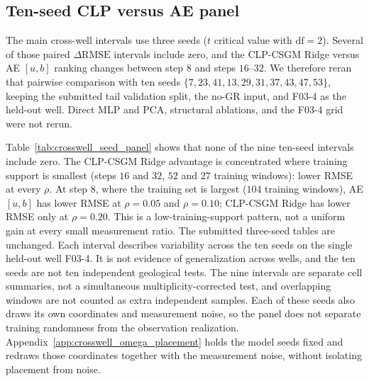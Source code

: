 \subsection{Ten-seed CLP versus AE panel}
\label{app:crosswell_seed_panel}

The main cross-well intervals use three seeds ($t$ critical value with
$\mathrm{df}=2$). Several of those paired $\Delta\mathrm{RMSE}$ intervals
include zero, and the CLP-CSGM Ridge versus AE $[u,b]$ ranking changes between
step $8$ and steps $16$--$32$. We therefore reran that pairwise comparison with
ten seeds $\{7,23,41,13,29,31,37,43,47,53\}$, keeping the submitted tail
validation split, the no-GR input, and F03-4 as the held-out well. Direct MLP
and PCA, structural ablations, and the F03-4 grid were not rerun.

\begin{table}[htbp]
  \centering
  \caption{Cross-well paired
  $\Delta\mathrm{RMSE}=\mathrm{RMSE}_{\mathrm{AE}}-\mathrm{RMSE}_{\mathrm{CLP}}$
  on ten seeds. SE is the seed-level standard error; the $95\%$ half-width uses
  Student-$t$ with $\mathrm{df}=9$. Positive mean $\Delta\mathrm{RMSE}$ favors
  CLP-CSGM Ridge. Wins count seeds with strictly lower RMSE.}
  \label{tab:crosswell_seed_panel}
  \small
\end{table}

Table~\ref{tab:crosswell_seed_panel} shows that none of the nine ten-seed
intervals include zero. The CLP-CSGM Ridge advantage is concentrated where
training support is smallest (steps $16$ and $32$, $52$ and $27$ training
windows): lower RMSE at every $\rho$. At step $8$, where the training set is
largest ($104$ training windows), AE $[u,b]$ has lower RMSE at
$\rho=0.05$ and $\rho=0.10$; CLP-CSGM Ridge has lower RMSE only at
$\rho=0.20$. This is a low-training-support pattern, not a uniform gain at
every small measurement ratio. The submitted three-seed tables are unchanged.
Each interval describes variability across the ten seeds on the single
held-out well F03-4. It is not evidence of generalization across wells, and
the ten seeds are not ten independent geological tests. The
nine intervals are separate cell summaries, not a simultaneous
multiplicity-corrected test, and overlapping windows are not counted as extra
independent samples. Each of these seeds also draws its own coordinates and
measurement noise, so the panel does not separate training randomness from
the observation realization.
Appendix~\ref{app:crosswell_omega_placement} holds the model seeds fixed and
redraws those coordinates together with the measurement noise, without
isolating placement from noise.


